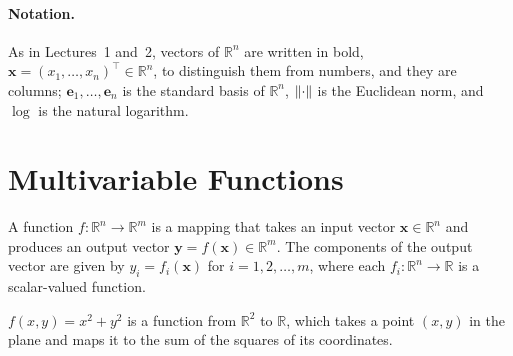 \paragraph{Notation.} As in Lectures~1 and~2, vectors of $\mathbb{R}^n$ are written in bold, $\mathbf{x} = (x_1, \ldots, x_n)^\top \in \mathbb{R}^n$, to distinguish them from numbers, and they are columns; $\mathbf{e}_1, \ldots, \mathbf{e}_n$ is the standard basis of $\mathbb{R}^n$, $\lVert \cdot \rVert$ is the Euclidean norm, and $\log$ is the natural logarithm.

\section{Multivariable Functions}

\begin{definition}\label{L3-def:multivariable}
    A function $f: \mathbb{R}^n \to \mathbb{R}^m$ is a mapping that takes an input vector $\mathbf{x} \in \mathbb{R}^n$ and produces an output vector $\mathbf{y} = f(\mathbf{x}) \in \mathbb{R}^m$.
    The components of the output vector are given by $y_i = f_i(\mathbf{x})$ for $i = 1, 2, \ldots, m$, where each $f_i: \mathbb{R}^n \to \mathbb{R}$ is a scalar-valued function.
\end{definition}

\begin{example}\label{L3-ex:paraboloid}
    $f(x, y) = x^2 + y^2$ is a function from $\mathbb{R}^2$ to $\mathbb{R}$, which takes a point $(x, y)$ in the plane and maps it to the sum of the squares of its coordinates.
\end{example}

